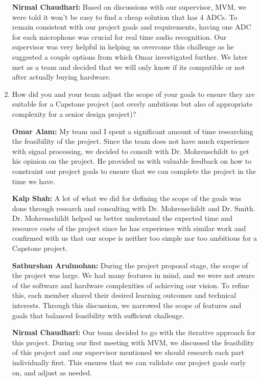 \documentclass{article}
\begin{document}
\begin{enumerate}
    \textbf{Nirmal Chaudhari:} Based on discussions with our supervisor, MVM, we were told it won't be easy to find a cheap solution that has 4 ADCs.
    To remain consistent with our project goals and requirements, having one ADC for each microphone was crucial for real time audio recognition. 
    Our supervisor was very helpful in helping us overcome this challenge as he suggested a couple options from which Omar investigated further. 
    We later met as a team and decided that we will only know if its compatible or not after actually buying hardware. 

    \item How did you and your team adjust the scope of your goals to ensure
    they are suitable for a Capstone project (not overly ambitious but also of
    appropriate complexity for a senior design project)?

    \textbf{Omar Alam:} My team and I spent a significant amount of time researching the feasibility of the project. Since the team does not have much
    experience with signal processing, we decided to consult with Dr. Mohrenschildt to get his opinion on the project. He provided us with valuable feedback on how
    to constraint our project goals to ensure that we can complete the project in the time we have.
    
    \textbf{Kalp Shah:} A lot of what we did for defining the scope of the goals was done through research and consulting with Dr. Mohrenschildt and Dr. Smith.
    Dr. Mohrenschildt helped us better understand the expected time and resource costs of the project since he has experience with similar work and confirmed
    with us that our scope is neither too simple nor too ambitious for a Capstone project.

    \textbf{Sathurshan Arulmohan:} During the project proposal stage, the scope of the project was large.
    We had many features in mind, and we were not aware of the software and hardware complexities of achieving our vision.
    To refine this, each member shared their desired learning outcomes and technical interests.
    Through this discussion, we narrowed the scope of features and goals that balanced feasibility with sufficient challenge.

    \textbf{Nirmal Chaudhari:} Our team decided to go with the iterative approach for this project. 
    During our first meeting with MVM, we discussed the feasibility of this project and our supervisor mentioned we should research each part individually first. 
    This ensures that we can validate our project goals early on, and adjust as needed. 

\end{enumerate}  



\end{document}
